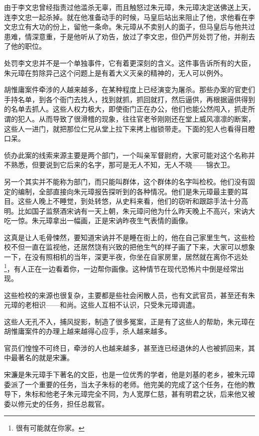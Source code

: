 \begin{multicols}{\theparacolNo}
		由于李文忠曾经指责过他滥杀无辜，而且触怒过朱元璋，朱元璋决定送佛送上天，连李文忠一起杀掉。就在他准备动手的时候，马皇后站出来阻止了他，求他看在李文忠立有大功的份上，留他一条命。朱元璋从不卖别人的面子，但马皇后与他共过患难，情深意重，于是他听从了劝告，放过了李文忠，但仍严厉处罚了他，并削去了他的职位。

		处罚李文忠并不是一个单独事件，它有着更深刻的含义。这件事告诉所有的大臣，朱元璋在剪除异己这个问题上是有着大义灭亲的精神的，无人可以例外。

		胡惟庸案件牵涉的人越来越多，在某种程度上已经演变为屠杀。那些办案的官吏们手持名单，到各个衙门去找人，找到就抓，抓回就打，然后逼供，再根据逼供得到的名单去抓人。这些人权力极大，即使衙门正在办公，他们也能公然闯入，抓走所谓的犯人。从而导致了很滑稽的现象，往往官老爷刚刚还在堂上威风凛凛的断案，这些人一进门，就把那位仁兄从堂上拉下来拷上枷锁带走。下面的犯人也看得目瞪口呆。

		侦办此案的线索来源主要是两个部门，一个叫亲军督尉府，大家可能对这个名称并不熟悉，但要说到它后来的名字，那可是无人不知，无人不晓——锦衣卫。

		另一个其实并不能称为部门，而只能叫群体，这个群体的名字叫检校。他们没有固定的编制，全部直接向朱元璋报告探听到的各种情况。他们是朱元璋最主要的耳目。这些人晚上不睡觉，到处转悠，从史料来看，他们的窃听和跟踪手法十分高明。比如国子监祭酒宋讷有一天上朝，朱元璋问他为什么昨天晚上不高兴，宋讷大吃一惊。朱元璋拿出一幅画，正是宋讷昨夜生气表情的画像。

		这真是让人毛骨悚然，要知道宋讷并不是睡在街上的，他在自己家里生气，这些检校不但一直在监视他，还居然饶有兴致的把他生气的样子画了下来，大家可以想象一下，在没有照相机的当年，深更半夜，你坐在自家房里，居然就在离你不远处\footnote{很有可能就在你家。}，有人正在一边看着你，一边帮你画像。这种情节在现代恐怖片中倒是经常出现。

		这些检校的来源也很复杂，主要都是些社会闲散人员，也有文武官员，甚至还有朱元璋的老相识——和尚。这些人互相不认识，只受朱元璋调遣。

		这些人无孔不入，捕风捉影，制造了很多冤案，正是有了这些人的帮助，朱元璋在胡惟庸案件的办理上越来越得心应手，杀人越来越多。

		官员们惶惶不可终日，牵涉的人也越来越多，甚至连已经退休的人也被抓回来，其中最著名的就是宋濂。

		宋濂是朱元璋手下著名的文臣，也是一位优秀的学者，他是刘基的老乡，被朱元璋委派了一个重要的任务，当太子朱标的老师。他完美的完成了这个任务，在他的教导下，朱标和他老子朱元璋完全不同，为人宽厚仁慈，甚有明君之状，后来他又被委以修元史的任务，担任总裁官。


\end{multicols}
